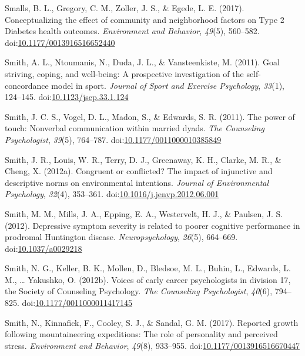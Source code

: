 \documentclass[english,man]{apa6}
\theoremstyle{definition}
\theoremstyle{definition}
\theoremstyle{definition}
\theoremstyle{remark}
\begin{document}
\hypertarget{ref-Smalls2017}{}
Smalls, B. L., Gregory, C. M., Zoller, J. S., \& Egede, L. E. (2017).
Conceptualizing the effect of community and neighborhood factors on Type
2 Diabetes health outcomes. \emph{Environment and Behavior},
\emph{49}(5), 560--582.
doi:\href{https://doi.org/10.1177/0013916516652440}{10.1177/0013916516652440}

\hypertarget{ref-Smith2011a}{}
Smith, A. L., Ntoumanis, N., Duda, J. L., \& Vansteenkiste, M. (2011).
Goal striving, coping, and well-being: A prospective investigation of
the self-concordance model in sport. \emph{Journal of Sport and Exercise
Psychology}, \emph{33}(1), 124--145.
doi:\href{https://doi.org/10.1123/jsep.33.1.124}{10.1123/jsep.33.1.124}

\hypertarget{ref-Smith2011}{}
Smith, J. C. S., Vogel, D. L., Madon, S., \& Edwards, S. R. (2011). The
power of touch: Nonverbal communication within married dyads. \emph{The
Counseling Psychologist}, \emph{39}(5), 764--787.
doi:\href{https://doi.org/10.1177/0011000010385849}{10.1177/0011000010385849}

\hypertarget{ref-Smith2012b}{}
Smith, J. R., Louis, W. R., Terry, D. J., Greenaway, K. H., Clarke, M.
R., \& Cheng, X. (2012a). Congruent or conflicted? The impact of
injunctive and descriptive norms on environmental intentions.
\emph{Journal of Environmental Psychology}, \emph{32}(4), 353--361.
doi:\href{https://doi.org/10.1016/j.jenvp.2012.06.001}{10.1016/j.jenvp.2012.06.001}

\hypertarget{ref-Smith2012a}{}
Smith, M. M., Mills, J. A., Epping, E. A., Westervelt, H. J., \&
Paulsen, J. S. (2012). Depressive symptom severity is related to poorer
cognitive performance in prodromal Huntington disease.
\emph{Neuropsychology}, \emph{26}(5), 664--669.
doi:\href{https://doi.org/10.1037/a0029218}{10.1037/a0029218}

\hypertarget{ref-Smith2012}{}
Smith, N. G., Keller, B. K., Mollen, D., Bledsoe, M. L., Buhin, L.,
Edwards, L. M., \ldots{} Yakushko, O. (2012b). Voices of early career
psychologists in division 17, the Society of Counseling Psychology.
\emph{The Counseling Psychologist}, \emph{40}(6), 794--825.
doi:\href{https://doi.org/10.1177/0011000011417145}{10.1177/0011000011417145}

\hypertarget{ref-Smith2017}{}
Smith, N., Kinnafick, F., Cooley, S. J., \& Sandal, G. M. (2017).
Reported growth following mountaineering expeditions: The role of
personality and perceived stress. \emph{Environment and Behavior},
\emph{49}(8), 933--955.
doi:\href{https://doi.org/10.1177/0013916516670447}{10.1177/0013916516670447}
\end{document}
